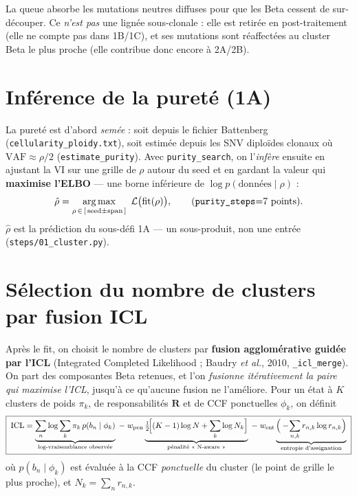 \documentclass[11pt,a4paper]{article}
\providecommand{\og}{\guillemotleft~}
\providecommand{\fg}{~\guillemotright}
\DeclareMathOperator*{\argmax}{arg\,max}
\newcommand{\code}[1]{\texttt{#1}}
\newcommand{\Rmat}{\mathbf{R}}
\newcommand{\half}{\tfrac12}
\theoremstyle{remark}
\begin{document}
La queue absorbe les mutations neutres diffuses pour que les Beta cessent de sur-découper.
Ce \emph{n'est pas} une lignée sous-clonale : elle est retirée en post-traitement (elle ne
compte pas dans 1B/1C), et ses mutations sont réaffectées au cluster Beta le plus proche
(elle contribue donc encore à 2A/2B).

\section{Inférence de la pureté (1A)}

La pureté est d'abord \emph{semée} : soit depuis le fichier Battenberg
(\code{cellularity\_ploidy.txt}), soit estimée depuis les SNV diploïdes clonaux où
$\text{VAF}\approx\rho/2$ (\code{estimate\_purity}). Avec \code{purity\_search}, on
l'\emph{infère} ensuite en ajustant la VI sur une grille de $\rho$ autour du seed et en
gardant la valeur qui \textbf{maximise l'ELBO} --- une borne inférieure de
$\log p(\text{données}\mid\rho)$ :
\begin{equation}\label{eq:purity}
\hat\rho=\argmax_{\rho\,\in\,[\,\text{seed}\pm\text{span}\,]}\ \mathcal L\big(\text{fit}(\rho)\big),
\qquad \text{(\code{purity\_steps}=7 points)}.
\end{equation}
$\hat\rho$ est la prédiction du sous-défi 1A --- un sous-produit, non une entrée
(\code{steps/01\_cluster.py}).

\section{Sélection du nombre de clusters par fusion ICL}

Après le fit, on choisit le nombre de clusters par \textbf{fusion agglomérative guidée par
l'ICL} (Integrated Completed Likelihood ; Baudry \emph{et al.}, 2010,
\code{\_icl\_merge}). On part des composantes Beta retenues, et l'on \emph{fusionne
itérativement la paire qui maximise l'ICL}, jusqu'à ce qu'aucune fusion ne l'améliore. Pour
un état à $K$ clusters de poids $\pi_k$, de responsabilités $\Rmat$ et de CCF ponctuelles
$\phi_k$, on définit
\begin{equation}\label{eq:icl}
\boxed{\;
\mathrm{ICL}=
\underbrace{\sum_{n}\log\sum_{k}\pi_k\,p(b_n\mid\phi_k)}_{\text{log-vraisemblance observée}}
\;-\;w_{\mathrm{pen}}\underbrace{\half\!\Big[(K-1)\log N+\sum_k\log N_k\Big]}_{\text{pénalité \og{}N-aware\fg{}}}
\;-\;w_{\mathrm{ent}}\underbrace{\Big(-\!\sum_{n,k} r_{n,k}\log r_{n,k}\Big)}_{\text{entropie d'assignation}}
\;}
\end{equation}
où $p(b_n\mid\phi_k)$ est évaluée à la CCF \emph{ponctuelle} du cluster (le point de grille
le plus proche), et $N_k=\sum_n r_{n,k}$.
\end{document}
